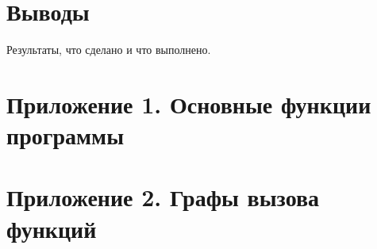 \documentclass[a4paper,12pt]{report}
\begin{document}



\chapter*{Выводы}

Результаты, что сделано и что выполнено.


\cleardoublepage
{}
{}
\chapter*{Приложение 1. Основные функции программы}


% 

% 
% 
% 
% 
% 
% 
% 
% 
% 
% 


\cleardoublepage
{}
{}
\chapter*{Приложение 2. Графы вызова функций}
\end{document}

